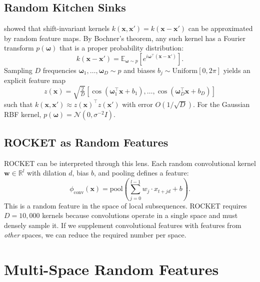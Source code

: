 \documentclass{article}
\begin{document}
\subsection{Random Kitchen Sinks}

\citet{rahimi2007random} showed that shift-invariant kernels $k(\mathbf{x}, \mathbf{x}') = k(\mathbf{x} - \mathbf{x}')$ can be approximated by random feature maps.
By Bochner's theorem, any such kernel has a Fourier transform $p(\boldsymbol{\omega})$ that is a proper probability distribution:
\begin{equation}
  k(\mathbf{x} - \mathbf{x}') = \mathbb{E}_{\boldsymbol{\omega} \sim p}\!\left[ e^{i\boldsymbol{\omega}^\top(\mathbf{x} - \mathbf{x}')} \right].
\end{equation}
Sampling $D$ frequencies $\boldsymbol{\omega}_1, \dots, \boldsymbol{\omega}_D \sim p$ and biases $b_j \sim \mathrm{Uniform}[0, 2\pi]$ yields an explicit feature map
\begin{equation}
  z(\mathbf{x}) = \sqrt{\tfrac{2}{D}}\left[\cos(\boldsymbol{\omega}_1^\top \mathbf{x} + b_1), \dots, \cos(\boldsymbol{\omega}_D^\top \mathbf{x} + b_D)\right]
\end{equation}
such that $k(\mathbf{x}, \mathbf{x}') \approx z(\mathbf{x})^\top z(\mathbf{x}')$ with error $O(1/\sqrt{D})$.
For the Gaussian RBF kernel, $p(\boldsymbol{\omega}) = \mathcal{N}(0, \sigma^{-2}I)$.

\subsection{ROCKET as Random Features}

ROCKET can be interpreted through this lens.
Each random convolutional kernel $\mathbf{w} \in \mathbb{R}^l$ with dilation $d$, bias $b$, and pooling defines a feature:
\begin{equation}
  \phi_{\mathrm{conv}}(\mathbf{x}) = \mathrm{pool}\!\left(\sum_{j=0}^{l-1} w_j \cdot x_{t+jd} + b\right).
\end{equation}
This is a random feature in the space of local subsequences.
ROCKET requires $D = 10{,}000$ kernels because convolutions operate in a single space and must densely sample it.
If we supplement convolutional features with features from \emph{other} spaces, we can reduce the required number per space.


\section{Multi-Space Random Features}
\label{sec:method}
\end{document}
